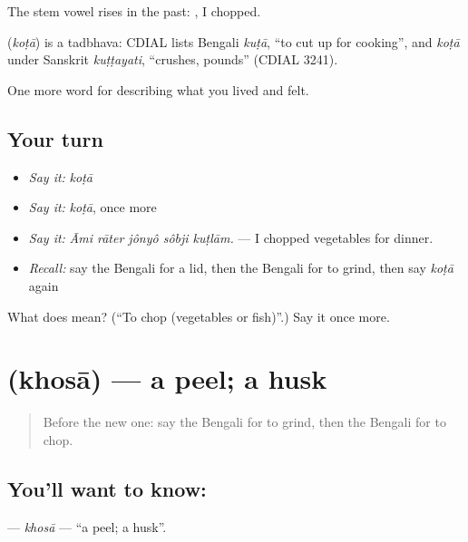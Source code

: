 The stem vowel rises in the past: , I chopped.

\begin{cousinweb}
\textbf{} (\emph{koṭā}) is a tadbhava: CDIAL lists Bengali \emph{kuṭā}, \textquotedblleft{}to cut up for cooking\textquotedblright{}, and \emph{koṭā} under Sanskrit \emph{kuṭṭayati}, \textquotedblleft{}crushes, pounds\textquotedblright{} (CDIAL 3241).
\end{cousinweb}

\begin{grammarlens}[title={What you've built}]
One more word for describing what you lived and felt.
\end{grammarlens}

\subsection*{Your turn}
\begin{itemize}
\raggedright
  \item \emph{Say it:} \emph{koṭā}
  \item \emph{Say it:} \emph{koṭā}, once more
  \item \emph{Say it:} \emph{Āmi rāter jônyô sôbji kuṭlām.} — I chopped vegetables for dinner.
  \item \emph{Recall:} say the Bengali for a lid, then the Bengali for to grind, then say \emph{koṭā} again
\end{itemize}

\begin{tcolorbox}[breakable,colback=teal!4,colframe=teal!35!black,title={Before you move on}]
What does  mean? (\textquotedblleft{}To chop (vegetables or fish)\textquotedblright{}.) Say it once more.
\end{tcolorbox}
\section[\texorpdfstring{\bn{খোসা} (khosā)}{খোসা (khosā)}]{ (khosā) — a peel; a husk}

\label{lesson:BN-C513-khosa}



\begin{quote}
Before the new one: say the Bengali for to grind, then the Bengali for to chop.
\end{quote}

\subsection*{You'll want to know: }
\textbf{} — \emph{khosā} — \textquotedblleft{}a peel; a husk\textquotedblright{}.

